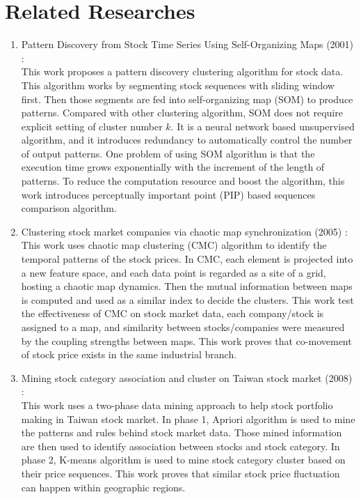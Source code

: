 \section{Related Researches}
\begin{enumerate}
    \item Pattern Discovery from Stock Time Series Using Self-Organizing Maps (2001) \cite{fu2001pattern}:\\ This work proposes a pattern discovery clustering algorithm for stock data. This algorithm works by segmenting stock sequences with sliding window first. Then those segments are fed into self-organizing map (SOM) to produce patterns. Compared with other clustering algorithm, SOM does not require explicit setting of cluster number $k$. It is a neural network based unsupervised algorithm, and it introduces redundancy to automatically control the number of output patterns. One problem of using SOM algorithm is that the execution time grows exponentially with the increment of the length of patterns. To reduce the computation resource and boost the algorithm, this work introduces perceptually important point (PIP) based sequences comparison algorithm.
    \item Clustering stock market companies via chaotic map synchronization (2005) \cite{basalto2005clustering}: \\
    This work uses chaotic map clustering (CMC) algorithm to identify the temporal patterns of the stock prices. In CMC, each element is projected into a new feature space, and each data point is regarded as a site of a grid, hosting a chaotic map dynamics. Then the mutual information between maps is computed and used as a similar index to decide the clusters. This work test the effectiveness of CMC on stock market data, each company/stock is assigned to a map, and similarity between stocks/companies were measured by the coupling strengths between maps. This work proves that co-movement of stock price exists in the same industrial branch. 
    \item Mining stock category association and cluster on Taiwan stock market (2008) \cite{liao2008mining}:\\
    This work uses a two-phase data mining approach to help stock portfolio making in Taiwan stock market. In phase 1, Apriori algorithm is used to mine the patterns and rules behind stock market data. Those mined information are then used to identify association between stocks and stock category. In phase 2, K-means algorithm is used to mine stock category cluster based on their price sequences. This work proves that similar stock price fluctuation can happen within geographic regions. 

\end{enumerate}
